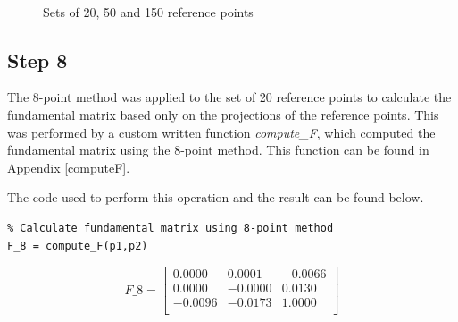 \documentclass[peerreview,11pt]{IEEEtran}
\begin{document}
\begin{figure}[ht]
	~
	\\
		
		
	\caption{Sets of 20, 50 and 150 reference points}
	\label{fig:refpoints}
\end{figure}





\subsection{Step 8}

The 8-point method was applied to the set of 20 reference points to calculate the fundamental matrix based only on the projections of the reference points. This was performed by a custom written function \textit{compute\_F}, which computed the fundamental matrix using the 8-point method. This function can be found in Appendix \ref{computeF}.

The code used to perform this operation and the result can be found below.

\begin{verbatim}
% Calculate fundamental matrix using 8-point method
F_8 = compute_F(p1,p2)
\end{verbatim}

\[
F\_8 = 
\begin{bmatrix}
    0.0000  &  0.0001  & -0.0066\\
    0.0000  & -0.0000  &  0.0130\\
   -0.0096  & -0.0173  &  1.0000\\
\end{bmatrix}
\]
\end{document}

